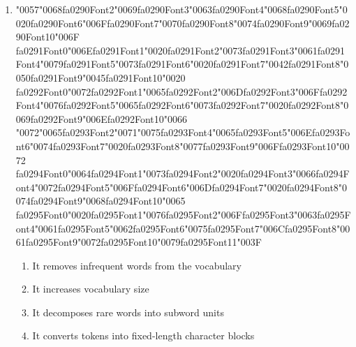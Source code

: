 \documentclass[12pt]{article}
\begin{document}
\begin{enumerate}[label=Q\arabic*.]
 \item {\char"0057}{\char"0068}{\csname fa0290Font2\endcsname\char"0069}{\csname fa0290Font3\endcsname\char"0063}{\csname fa0290Font4\endcsname\char"0068}{\csname fa0290Font5\endcsname\char"0020}{\csname fa0290Font6\endcsname\char"006F}{\csname fa0290Font7\endcsname\char"0070}{\csname fa0290Font8\endcsname\char"0074}{\csname fa0290Font9\endcsname\char"0069}{\csname fa0290Font10\endcsname\char"006F} {\csname fa0291Font0\endcsname\char"006E}{\csname fa0291Font1\endcsname\char"0020}{\csname fa0291Font2\endcsname\char"0073}{\csname fa0291Font3\endcsname\char"0061}{\csname fa0291Font4\endcsname\char"0079}{\csname fa0291Font5\endcsname\char"0073}{\csname fa0291Font6\endcsname\char"0020}{\csname fa0291Font7\endcsname\char"0042}{\csname fa0291Font8\endcsname\char"0050}{\csname fa0291Font9\endcsname\char"0045}{\csname fa0291Font10\endcsname\char"0020} {\csname fa0292Font0\endcsname\char"0072}{\csname fa0292Font1\endcsname\char"0065}{\csname fa0292Font2\endcsname\char"006D}{\csname fa0292Font3\endcsname\char"006F}{\csname fa0292Font4\endcsname\char"0076}{\csname fa0292Font5\endcsname\char"0065}{\csname fa0292Font6\endcsname\char"0073}{\csname fa0292Font7\endcsname\char"0020}{\csname fa0292Font8\endcsname\char"0069}{\csname fa0292Font9\endcsname\char"006E}{\csname fa0292Font10\endcsname\char"0066} {\char"0072}{\char"0065}{\csname fa0293Font2\endcsname\char"0071}{\char"0075}{\csname fa0293Font4\endcsname\char"0065}{\csname fa0293Font5\endcsname\char"006E}{\csname fa0293Font6\endcsname\char"0074}{\csname fa0293Font7\endcsname\char"0020}{\csname fa0293Font8\endcsname\char"0077}{\csname fa0293Font9\endcsname\char"006F}{\csname fa0293Font10\endcsname\char"0072} {\csname fa0294Font0\endcsname\char"0064}{\csname fa0294Font1\endcsname\char"0073}{\csname fa0294Font2\endcsname\char"0020}{\csname fa0294Font3\endcsname\char"0066}{\csname fa0294Font4\endcsname\char"0072}{\csname fa0294Font5\endcsname\char"006F}{\csname fa0294Font6\endcsname\char"006D}{\csname fa0294Font7\endcsname\char"0020}{\csname fa0294Font8\endcsname\char"0074}{\csname fa0294Font9\endcsname\char"0068}{\csname fa0294Font10\endcsname\char"0065} {\csname fa0295Font0\endcsname\char"0020}{\csname fa0295Font1\endcsname\char"0076}{\csname fa0295Font2\endcsname\char"006F}{\csname fa0295Font3\endcsname\char"0063}{\csname fa0295Font4\endcsname\char"0061}{\csname fa0295Font5\endcsname\char"0062}{\csname fa0295Font6\endcsname\char"0075}{\csname fa0295Font7\endcsname\char"006C}{\csname fa0295Font8\endcsname\char"0061}{\csname fa0295Font9\endcsname\char"0072}{\csname fa0295Font10\endcsname\char"0079}{\csname fa0295Font11\endcsname\char"003F}
 \begin{enumerate}[label=(\Alph*)]
     \item It removes infrequent words from the vocabulary
     \item It increases vocabulary size
     \item It decomposes rare words into subword units
     \item It converts tokens into fixed-length character blocks
 \end{enumerate}
 

\end{enumerate}
\end{document}
